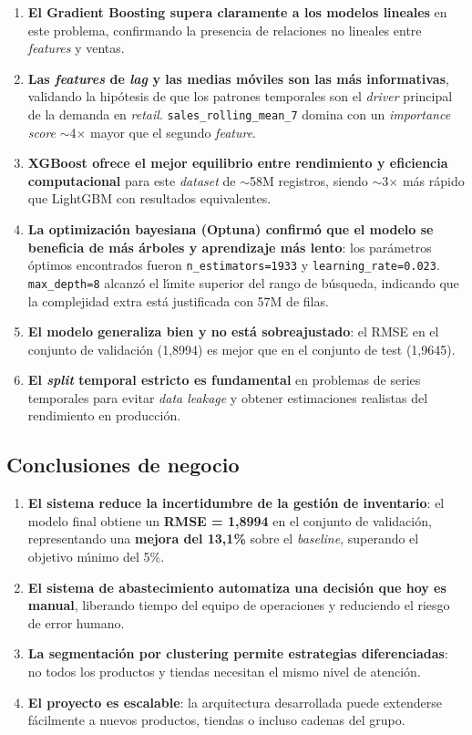 \documentclass[12pt, a4paper, oneside]{report}
\newcommand{\kpi}[1]{\textbf{\color{accentorange}#1}}
\newcommand{\code}[1]{\texttt{\small\color{codeblue}#1}}
\newcommand{\metric}[1]{\textbf{\color{accentorange}#1}}
\begin{document}
\begin{enumerate}[leftmargin=*, noitemsep]
  \item \textbf{El Gradient Boosting supera claramente a los modelos lineales} en este problema, confirmando la presencia de relaciones no lineales entre \textit{features} y ventas.
  \item \textbf{Las \textit{features} de \textit{lag} y las medias m\'oviles son las m\'as informativas}, validando la hip\'otesis de que los patrones temporales son el \textit{driver} principal de la demanda en \textit{retail}. \code{sales\_rolling\_mean\_7} domina con un \textit{importance score} $\sim$4$\times$ mayor que el segundo \textit{feature}.
  \item \textbf{XGBoost ofrece el mejor equilibrio entre rendimiento y eficiencia computacional} para este \textit{dataset} de $\sim$58M registros, siendo $\sim$3$\times$ m\'as r\'apido que LightGBM con resultados equivalentes.
  \item \textbf{La optimizaci\'on bayesiana (Optuna) confirm\'o que el modelo se beneficia de m\'as \'arboles y aprendizaje m\'as lento}: los par\'ametros \'optimos encontrados fueron \code{n\_estimators=1933} y \code{learning\_rate=0.023}. \code{max\_depth=8} alcanz\'o el l\'{\i}mite superior del rango de b\'usqueda, indicando que la complejidad extra est\'a justificada con 57M de filas.
  \item \textbf{El modelo generaliza bien y no est\'a sobreajustado}: el RMSE en el conjunto de validaci\'on (1,8994) es mejor que en el conjunto de test (1,9645).
  \item \textbf{El \textit{split} temporal estricto es fundamental} en problemas de series temporales para evitar \textit{data leakage} y obtener estimaciones realistas del rendimiento en producci\'on.
\end{enumerate}

\subsection{Conclusiones de negocio}

\begin{enumerate}[leftmargin=*, noitemsep]
  \item \textbf{El sistema reduce la incertidumbre de la gesti\'on de inventario}: el modelo final obtiene un \metric{RMSE = 1,8994} en el conjunto de validaci\'on, representando una \kpi{mejora del 13,1\%} sobre el \textit{baseline}, superando el objetivo m\'{\i}nimo del 5\%.
  \item \textbf{El sistema de abastecimiento automatiza una decisi\'on que hoy es manual}, liberando tiempo del equipo de operaciones y reduciendo el riesgo de error humano.
  \item \textbf{La segmentaci\'on por clustering permite estrategias diferenciadas}: no todos los productos y tiendas necesitan el mismo nivel de atenci\'on.
  \item \textbf{El proyecto es escalable}: la arquitectura desarrollada puede extenderse f\'acilmente a nuevos productos, tiendas o incluso cadenas del grupo.
\end{enumerate}
\end{document}
